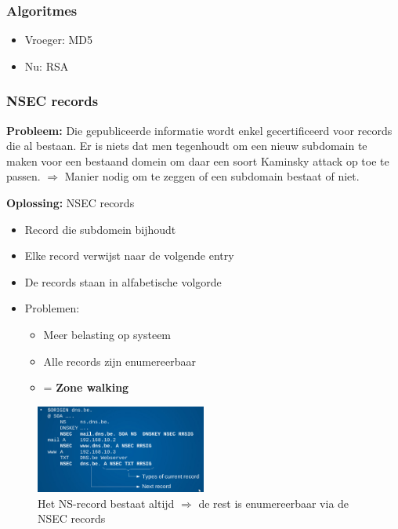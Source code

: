\documentclass{article}
\newcommand{\bold}[1]{\textbf{#1}}
\begin{document}
\subsubsection{Algoritmes}

\begin{itemize}
    \item Vroeger: MD5
    \item Nu: RSA
\end{itemize}

\subsubsection{NSEC records}

\bold{Probleem:} Die gepubliceerde informatie wordt enkel gecertificeerd voor records die al bestaan. 
Er is niets dat men tegenhoudt om een nieuw subdomain te maken voor een bestaand domein om daar een soort Kaminsky attack op toe te passen.
$\Rightarrow$ Manier nodig om te zeggen of een subdomain bestaat of niet.

\bold{Oplossing:} NSEC records

\begin{itemize}
    \item Record die subdomein bijhoudt
    \item Elke record verwijst naar de volgende entry
    \item De records staan in alfabetische volgorde
    \item Problemen:
    \begin{itemize}
        \item Meer belasting op systeem
        \item Alle records zijn enumereerbaar
        \item = \bold{Zone walking}
    \end{itemize}
\end{itemize}

\begin{figure}[H]
    \centering
    \includegraphics[width=0.5\textwidth]{nsec.png}
    \caption{Het NS-record bestaat altijd $\Rightarrow$ de rest is enumereerbaar via de NSEC records}
\end{figure}
\end{document}
